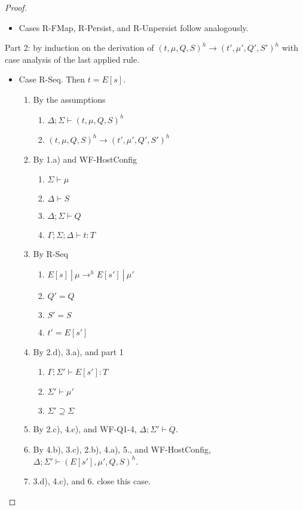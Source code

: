 \begin{proof}
\begin{itemize}
\item Cases R-FMap, R-Persist, and R-Unpersist follow analogously.
\end{itemize}

Part 2: by induction on the derivation of $(t, \mu, Q, S)^h \longrightarrow (t', \mu', Q', S')^h$ with case analysis of the last applied rule.

\begin{itemize}

\item Case R-Seq. Then $t = E[s]$.
\begin{enumerate}
\item By the assumptions
  \begin{enumerate}[label=(\alph*)]
  \item $\Delta ; \Sigma \vdash (t, \mu, Q, S)^h$
  \item $(t, \mu, Q, S)^h \longrightarrow (t', \mu', Q', S')^h$
  \end{enumerate}
\item By 1.a) and WF-HostConfig
  \begin{enumerate}[label=(\alph*)]
  \item $\Sigma \vdash \mu$
  \item $\Delta \vdash S$
  \item $\Delta ; \Sigma \vdash Q$
  \item $\Gamma ; \Sigma ; \Delta \vdash t : T$
  \end{enumerate}
\item By R-Seq
  \begin{enumerate}[label=(\alph*)]
  \item $E[s]~|~\mu \rightarrow^h E[s']~|~\mu'$
  \item $Q' = Q$
  \item $S' = S$
  \item $t' = E[s']$
  \end{enumerate}
\item By 2.d), 3.a), and part 1
  \begin{enumerate}[label=(\alph*)]
  \item $\Gamma ; \Sigma' \vdash E[s'] : T$
  \item $\Sigma' \vdash \mu'$
  \item $\Sigma' \supseteq \Sigma$
  \end{enumerate}
\item By 2.c), 4.c), and WF-Q1-4, $\Delta ; \Sigma' \vdash Q$.
\item By 4.b), 3.c), 2.b), 4.a), 5., and WF-HostConfig, $\Delta ; \Sigma' \vdash (E[s'], \mu', Q, S)^h$.
\item 3.d), 4.c), and 6. close this case.
\end{enumerate}


\end{itemize}
\end{proof}
